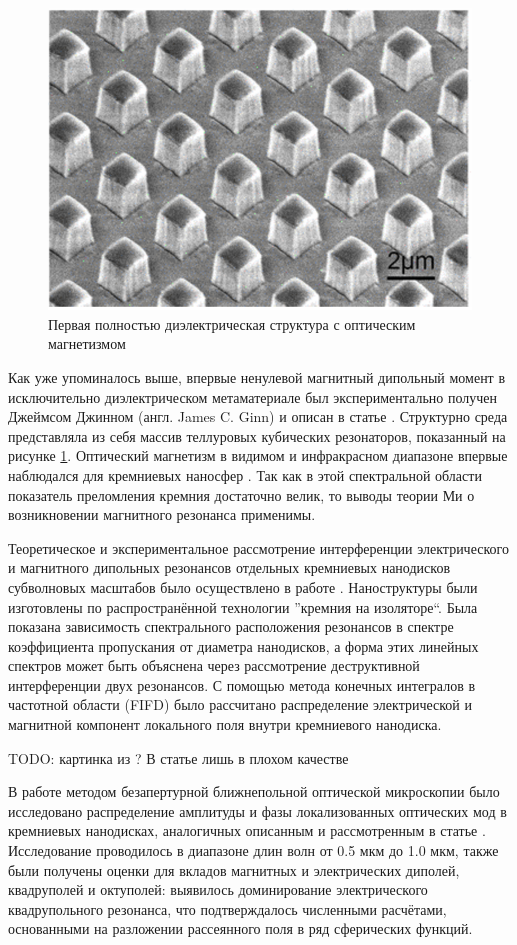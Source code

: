\begin{figure}[h]
	\centering
	\includegraphics[width=.7\textwidth]{img/Ginn}
	\caption{Первая полностью диэлектрическая структура с оптическим магнетизмом \cite{Ginn2012}}
	\label{fig:ginn}
\end{figure}

Как уже упоминалось выше, впервые ненулевой магнитный дипольный момент в исключительно диэлектрическом метаматериале был экспериментально получен Джеймсом Джинном (англ. James C. Ginn) и описан в статье \cite{Ginn2012}. Структурно среда представляла из себя массив теллуровых кубических резонаторов, показанный на рисунке \ref{fig:ginn}. Оптический магнетизм в видимом и инфракрасном диапазоне впервые наблюдался для кремниевых наносфер \cite{Evlyukhin2012a, Kuznetsov2012}. Так как в этой спектральной области показатель преломления кремния достаточно велик, то выводы теории Ми о возникновении магнитного резонанса \cite{Zhao2009} применимы.

Теоретическое и экспериментальное рассмотрение интерференции электрического и магнитного дипольных резонансов отдельных кремниевых нанодисков субволновых масштабов было осуществлено в работе \cite{Staude2013}. Наноструктуры были изготовлены по распространённой технологии ''кремния на изоляторе``. Была показана зависимость спектрального расположения резонансов в спектре коэффициента пропускания от диаметра нанодисков, а форма этих линейных спектров может быть объяснена через рассмотрение деструктивной интерференции двух резонансов. С помощью метода конечных интегралов в частотной области (FIFD) было рассчитано распределение электрической и магнитной компонент локального поля внутри кремниевого нанодиска.

TODO: картинка из \cite{Staude2013}? В статье лишь в плохом качестве

В работе \cite{Habteyes2014} методом безапертурной ближнепольной оптической микроскопии было исследовано распределение амплитуды и фазы локализованных оптических мод в кремниевых нанодисках, аналогичных описанным и рассмотренным в статье \cite{Staude2013}. Исследование проводилось в диапазоне длин волн от 0.5 мкм до 1.0 мкм, также были получены оценки для вкладов магнитных и электрических диполей, квадруполей и октуполей: выявилось доминирование электрического квадрупольного резонанса, что подтверждалось численными расчётами, основанными на разложении рассеянного поля в ряд сферических функций.

